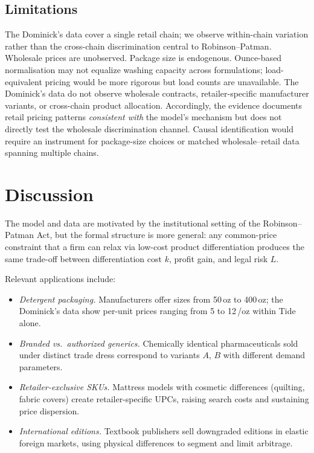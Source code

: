\documentclass[11pt,a4paper]{article}
\theoremstyle{plain}
\theoremstyle{definition}
\theoremstyle{remark}
\begin{document}


\subsection{Limitations}

The Dominick's data cover a single retail chain; we observe within-chain variation rather than the cross-chain discrimination central to Robinson--Patman.
Wholesale prices are unobserved.
Package size is endogenous.
Ounce-based normalisation may not equalize washing capacity across formulations; load-equivalent pricing would be more rigorous but load counts are unavailable.
The Dominick's data do not observe wholesale contracts, retailer-specific manufacturer variants, or cross-chain product allocation.
Accordingly, the evidence documents retail pricing patterns \emph{consistent with} the model's mechanism but does not directly test the wholesale discrimination channel.
Causal identification would require an instrument for package-size choices or matched wholesale--retail data spanning multiple chains.


\section{Discussion}\label{sec:discussion}

The model and data are motivated by the institutional setting of the Robinson--Patman Act, but the formal structure is more general: any common-price constraint that a firm can relax via low-cost product differentiation produces the same trade-off between differentiation cost $k$, profit gain, and legal risk $L$.

Relevant applications include:
\begin{itemize}[nosep]
  \item \emph{Detergent packaging.} Manufacturers offer sizes from 50\,oz to 400\,oz; the Dominick's data show per-unit prices ranging from 5 to 12\,\textcent/oz within Tide alone.
  \item \emph{Branded vs.\ authorized generics.} Chemically identical pharmaceuticals sold under distinct trade dress correspond to variants $A$, $B$ with different demand parameters.
  \item \emph{Retailer-exclusive SKUs.} Mattress models with cosmetic differences (quilting, fabric covers) create retailer-specific UPCs, raising search costs and sustaining price dispersion.
  \item \emph{International editions.} Textbook publishers sell downgraded editions in elastic foreign markets, using physical differences to segment and limit arbitrage.
\end{itemize}
\end{document}
